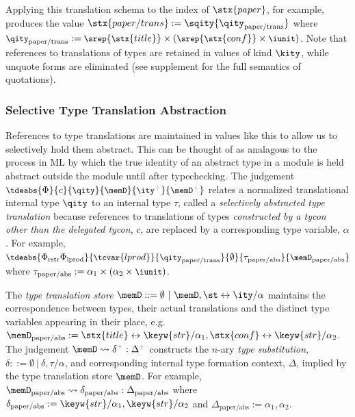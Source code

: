 Applying this translation schema to the index of $\stx{paper}$, for example, produces the value  $\stx{paper/trans} := \sqity{\qity_\text{paper/trans}}$ where $\small\qity_\text{paper/trans} := \srep{\stx{title}}\times(\srep{\stx{conf}}\times \iunit)$. Note  that references to translations of types are retained in values of kind $\kity$, while unquote forms are eliminated (see supplement for the full semantics of quotations).%


\noindent
\subsubsection{Selective Type Translation Abstraction}\label{sec:selective-type-translation-abstraction}
\noindent
References to type translations are maintained in values like this to  allow us to selectively hold them abstract. This can be thought of as analagous to the process in ML by which the true identity of an abstract type in a module is held abstract outside the module until after typechecking. The judgement $\small\tdeabs{\Phi}{c}{\qity}{\memD}{\ity\moutput}{\memD\moutput}$ relates a normalized translational internal type $\qity$ to an internal type $\tau$, called a \emph{selectively abstracted type translation} because references to translations of types \emph{constructed by a tycon other than the delegated tycon}, $c$, are replaced by a corresponding type variable, $\alpha$. For example, $\small\tdeabs{\Phi_\text{rstr}\Phi_\text{lprod}}{\tcvar{lprod}}{\qity_\text{paper/trans}}{\emptyset}{\tau_\text{paper/abs}}{\memD_\text{paper/abs}}$
where $\small\tau_\text{paper/abs} := \alpha_1 \times (\alpha_2 \times \iunit)$. 

The \emph{type translation store} $\memD ::= \emptyset ~|~ \memD, \st \leftrightarrow \ity/\alpha$ maintains the correspondence between types, their actual translations and the distinct type variables appearing in their place,  e.g. 
$\memD_\text{paper/abs}  := \stx{title} \leftrightarrow \keyw{str}/\alpha_1, \stx{conf} \leftrightarrow \keyw{str}/\alpha_2$. The judgement $\memD \leadsto \delta\moutput : \Delta\moutput$ constructs the $n$-ary \emph{type substitution}, $\delta ::= \emptyset ~|~ \delta, \tau/\alpha$, and corresponding internal type formation context, $\Delta$, implied by the type translation store $\memD$. For example, $\memD_\text{paper/abs} \leadsto \delta_\text{paper/abs} : \Delta_\text{paper/abs}$ where $\delta_\text{paper/abs} := \keyw{str}/\alpha_1, \keyw{str}/\alpha_2$ and $\Delta_\text{paper/abs} := \alpha_1, \alpha_2$. 

